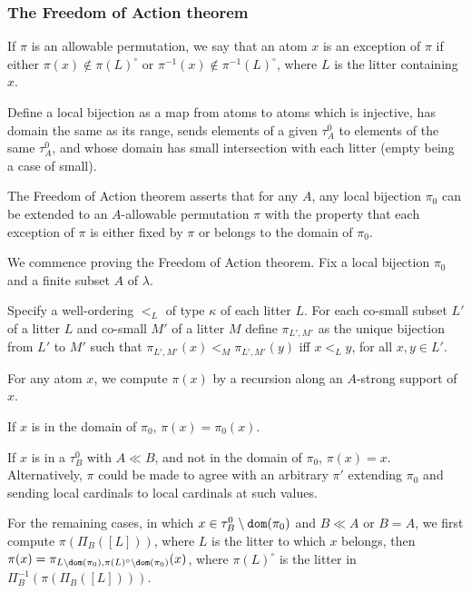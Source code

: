 \documentclass[12pt]{article}
\begin{document}
\newpage

\subsubsection{The Freedom of Action theorem}

If $\pi$ is an allowable permutation, we say that an atom $x$ is
an exception of $\pi$ if either $\pi(x) \not\in \pi(L)^{\circ}$ or $\pi^{-1}(x) \not\in \pi^{-1}(L)^\circ$, where $L$ is the litter containing $x$.

Define a local bijection as a map from atoms to atoms which is injective, has domain the same as its range,  sends elements of a given $\tau^0_A$ to elements of the same
$\tau^0_A$, and whose domain has small intersection with each litter (empty being a case of small).



The Freedom of Action theorem asserts that for any $A$, any local bijection $\pi_0$ %
can be extended to an $A$-allowable permutation $\pi$ with the property that each exception of $\pi$ is either
fixed by $\pi$ or belongs to the domain of $\pi_0$.

We commence proving the Freedom of Action theorem.  Fix a local bijection $\pi_0$ and a finite subset $A$ of $\lambda$. 

Specify a well-ordering $<_L$ of type $\kappa$ of each litter $L$.  For each co-small subset $L'$ of a litter $L$ and co-small $M'$ of a litter $M$ define $\pi_{L',M'}$ as
the unique bijection from $L'$ to $M'$ such that $\pi_{L',M'}(x) <_M \pi_{L',M'}(y)$ iff $x <_L y$, for all $x,y \in L'$.  

For any atom $x$, we compute $\pi(x)$ by a recursion along an $A$-strong support of $x$. 

If $x$ is in the domain of $\pi_0$, $\pi(x) = \pi_0(x)$.

If $x$ is in a $\tau^0_B$ with $A \ll B$, and not in the domain of $\pi_0$, $\pi(x)=x$.  Alternatively, $\pi$ could be made to agree with an arbitrary $\pi'$ extending $\pi_0$ and sending local cardinals to local cardinals at such values.

For the remaining cases, in which $x \in \tau^0_B \setminus {\tt dom}(\pi_0)$ and $B \ll A$ or $B=A$, we first compute $\pi(\Pi_B([L]))$, where $L$ is the litter to which $x$ belongs,
then $\pi(x) = \pi_{L \setminus {\tt dom}(\pi_0),\pi(L)^\circ \setminus {\tt dom}(\pi_0)}(x)$, where $\pi(L)^\circ$ is the litter in $\Pi_B^{-1}(\pi(\Pi_B([L])))$.
\end{document}
